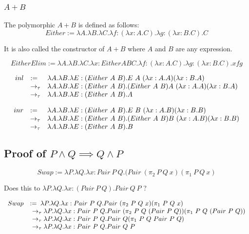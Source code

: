 \subsubsection{$A + B$}

The polymorphic $A + B$ is defined as follows:
\[
    Either := \lambda A.\lambda B.\lambda C.\lambda f:(\lambda x:A.C).\lambda g:(\lambda x:B.C).C
\]

It is also called the constructor of $A + B$ where $A$ and $B$ are any expression.

\[
    EitherElim := \lambda A.\lambda B.\lambda C.\lambda x: Either A B C.\lambda f:(\lambda x:A.C).\lambda g:(\lambda x:B.C).x f g
\]

\[
\begin{array}{lll}
    inl & :=        & \lambda A.\lambda B.\lambda E:(Either\ A\ B).E\ A\ (\lambda x:A.A) (\lambda x:B.A) \\
        & \totau    & \lambda A.\lambda B.\lambda E:(Either\ A\ B).(Either\ A\ B)A\ (\lambda x:A.A) (\lambda x:B.A) \\
        & \totau    & \lambda A.\lambda B.\lambda E:(Either\ A\ B).A \\
\end{array}
\]

\[
\begin{array}{lll}
    inr & :=        & \lambda A.\lambda B.\lambda E:(Either\ A\ B).E\ B\ (\lambda x:A.B) (\lambda x:B.B) \\
        & \totau    & \lambda A.\lambda B.\lambda E:(Either\ A\ B).(Either\ A\ B)B\ (\lambda x:A.B) (\lambda x:B.B) \\
        & \totau    & \lambda A.\lambda B.\lambda E:(Either\ A\ B).B
\end{array}
\]


\subsection{Proof of $P \land Q \implies Q \land P$}

\[
    Swap := \lambda P.\lambda Q.\lambda x:Pair\ P\ Q.(Pair\ (\pi_2\ P\ Q\ x) (\pi_1\ P\ Q\ x)
\]

Does this \taureduces to $\lambda P.\lambda Q.\lambda x:(Pair\ P\ Q).Pair\ Q\ P$ ?

\[
\begin{array}{ll}
    Swap    & :=\;         \lambda P.\lambda Q.\lambda x:Pair\ P\ Q.Pair\ (\pi_2\ P\ Q\ x) (\pi_1\ P\ Q\ x) \\
            &\ \totau      \lambda P.\lambda Q.\lambda x:Pair\ P\ Q.Pair\ (\pi_2\ P\ Q\ (Pair\ P\ Q)) (\pi_1\ P\ Q\ (Pair\ P\ Q)) \\
            &\ \totau      \lambda P.\lambda Q.\lambda x:Pair\ P\ Q.Pair\ Q (\pi_1\ P\ Q\ Pair\ P\ Q) \\
            &\ \totau      \lambda P.\lambda Q.\lambda x:Pair\ P\ Q.Pair\ Q\ P \\
\end{array}
\]

